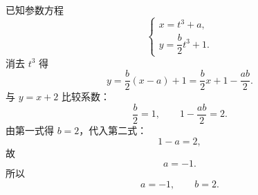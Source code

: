 \begin{answer}
已知参数方程
\nopagebreak[4]
\[\begin{cases}x=t^3+a,\\ y=\dfrac b2t^3+1.\end{cases}\]
消去 $t^3$ 得
\nopagebreak[4]
\[y=\frac b2(x-a)+1
=\frac b2x+1-\frac{ab}2.\]
与 $y=x+2$ 比较系数：
\nopagebreak[4]
\[\frac b2=1,\qquad 1-\frac{ab}2=2.\]
由第一式得 $b=2$，代入第二式：
\nopagebreak[4]
\[1-a=2,\]
故
\nopagebreak[4]
\[a=-1.\]
所以
\nopagebreak[4]
\[a=-1,\qquad b=2.\]



\end{answer}
